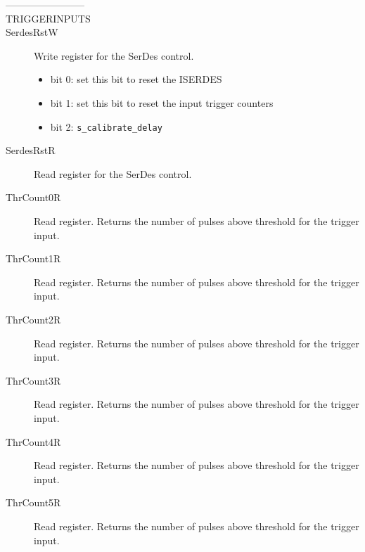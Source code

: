 \begin{description}
  \item[------------------------]
  \item[TRIGGERINPUTS]
  \item[SerdesRstW] Write register for the SerDes control.\begin{itemize}
                                                            \item bit 0: set this bit to reset the ISERDES
                                                            \item bit 1: set this bit to reset the input trigger counters
                                                            \item bit 2: \verb|s_calibrate_delay|
                                                          \end{itemize}
  \item[SerdesRstR] Read register for the SerDes control.
  \item[ThrCount0R] Read register. Returns the number of pulses above threshold for the trigger input.
  \item[ThrCount1R] Read register. Returns the number of pulses above threshold for the trigger input.
  \item[ThrCount2R] Read register. Returns the number of pulses above threshold for the trigger input.
  \item[ThrCount3R] Read register. Returns the number of pulses above threshold for the trigger input.
  \item[ThrCount4R] Read register. Returns the number of pulses above threshold for the trigger input.
  \item[ThrCount5R] Read register. Returns the number of pulses above threshold for the trigger input.
\end{description}

